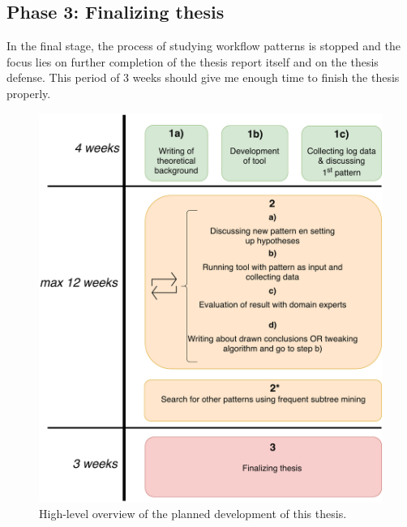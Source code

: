\documentclass[a4paper,11pt]{article}
\begin{document}
\subsection{Phase 3: Finalizing thesis}
In the final stage, the process of studying workflow patterns is stopped and the focus lies on further completion of the thesis report itself and on the thesis defense. This period of 3 weeks should give me enough time to finish the thesis properly.

\begin{figure}[H]
\centering
\includegraphics[width=.7\linewidth]{Planning.pdf}
\caption{High-level overview of the planned development of this thesis.}
\label{figure:planningOverview}
\end{figure}



\end{document}
